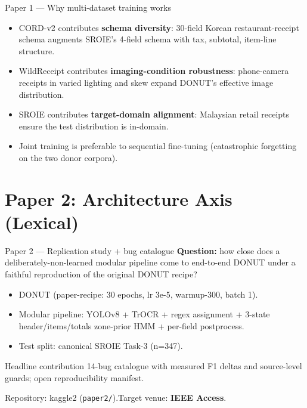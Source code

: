 \documentclass{beamer}
\begin{document}
\begin{frame}{Paper 1 --- Why multi-dataset training works}
  \begin{itemize}
    \item CORD-v2 contributes \textbf{schema diversity}: 30-field Korean
          restaurant-receipt schema augments SROIE's 4-field schema with
          tax, subtotal, item-line structure.
    \item WildReceipt contributes \textbf{imaging-condition robustness}:
          phone-camera receipts in varied lighting and skew expand
          DONUT's effective image distribution.
    \item SROIE contributes \textbf{target-domain alignment}: Malaysian
          retail receipts ensure the test distribution is in-domain.
    \item Joint training is preferable to sequential fine-tuning
          (catastrophic forgetting on the two donor corpora).
  \end{itemize}
\end{frame}

\section{Paper 2: Architecture Axis (Lexical)}
\begin{frame}{Paper 2 --- Replication study + bug catalogue}
  \textbf{Question:} how close does a deliberately-non-learned modular
  pipeline come to end-to-end DONUT under a faithful reproduction of the
  original DONUT recipe?
  \vspace{0.5em}
  \begin{itemize}
    \item DONUT (paper-recipe: 30 epochs, lr 3e-5, warmup-300, batch 1).
    \item Modular pipeline: YOLOv8 + TrOCR + regex assignment + 3-state
          header/items/totals zone-prior HMM + per-field postprocess.
    \item Test split: canonical SROIE Task-3 (n=347).
  \end{itemize}
  \begin{block}{Headline contribution}
    14-bug catalogue with measured F1 deltas and source-level guards;
    open reproducibility manifest.
  \end{block}
  Repository: kaggle2 (\texttt{paper2/}).\quad Target venue: \textbf{IEEE Access}.
\end{frame}
\end{document}
